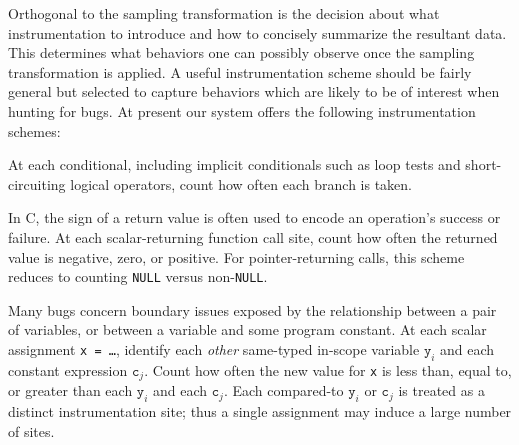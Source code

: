 \documentclass[draft]{sig-alternate}
\begin{document}
Orthogonal to the sampling transformation is the decision about what
instrumentation to introduce and how to concisely
summarize the resultant data.  This determines what behaviors one can
possibly observe once the sampling transformation is applied.  A useful instrumentation
scheme should be fairly general but selected to capture behaviors
which are likely to be of interest when hunting for bugs.  At present
our system offers the following instrumentation schemes:

\begin{description}
\sloppy
\item[branches:] At each conditional, including implicit conditionals
such as loop tests and short-circuiting logical operators,
  count how often each branch is taken.  

\item[returns:] In C, the
  sign of a return value is often used to encode an operation's success or failure.
  At each scalar-returning function call site, count how
  often the returned value is negative, zero, or positive.  For
  pointer-returning calls, this scheme reduces to counting
  \texttt{NULL} versus non-\texttt{NULL}.  

\item[scalar-pairs:] Many bugs
  concern boundary issues exposed by the relationship between a pair
  of variables, or between a variable and some program constant.  At
  each scalar assignment \texttt{x = \dots}, identify each
  \emph{other} same-typed in-scope variable $\mathtt{y}_i$ and each
  constant expression $\mathtt{c}_j$.  Count how often the new value
  for \texttt{x} is less than, equal to, or greater than each
  $\mathtt{y}_i$ and each $\mathtt{c}_j$.  
Each compared-to $\mathtt{y}_i$
  or $\mathtt{c}_j$ is treated as a distinct instrumentation site;
  thus a single assignment may induce a large number of sites.  
\end{description}
\end{document}
